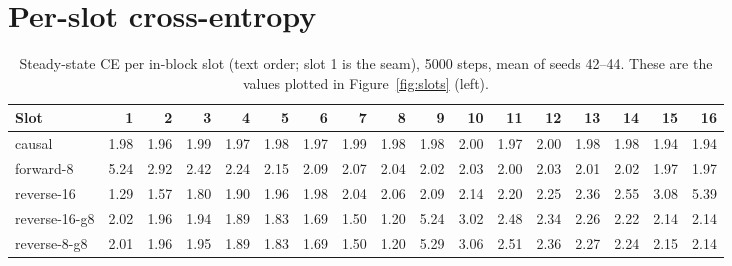 \documentclass[11pt]{article}
\theoremstyle{definition}
\theoremstyle{remark}
\newcommand{\sch}[1]{\textsf{#1}}
\begin{document}
\section{Per-slot cross-entropy}
\label{app:slots}

\begin{table}[h]
  \centering
  \caption{Steady-state CE per in-block slot (text order; slot 1 is the seam), 5000 steps, mean of seeds 42--44. These are the values plotted in Figure~\ref{fig:slots} (left).}
  \label{tab:slots}
  \scriptsize
  \setlength{\tabcolsep}{2.6pt}
  \begin{tabular}{l*{16}{r}}
    \toprule
    Slot & 1 & 2 & 3 & 4 & 5 & 6 & 7 & 8 & 9 & 10 & 11 & 12 & 13 & 14 & 15 & 16 \\
    \midrule
    \sch{causal}        & 1.98 & 1.96 & 1.99 & 1.97 & 1.98 & 1.97 & 1.99 & 1.98 & 1.98 & 2.00 & 1.97 & 2.00 & 1.98 & 1.98 & 1.94 & 1.94 \\
    \sch{forward-8}     & 5.24 & 2.92 & 2.42 & 2.24 & 2.15 & 2.09 & 2.07 & 2.04 & 2.02 & 2.03 & 2.00 & 2.03 & 2.01 & 2.02 & 1.97 & 1.97 \\
    \sch{reverse-16}    & 1.29 & 1.57 & 1.80 & 1.90 & 1.96 & 1.98 & 2.04 & 2.06 & 2.09 & 2.14 & 2.20 & 2.25 & 2.36 & 2.55 & 3.08 & 5.39 \\
    \sch{reverse-16-g8} & 2.02 & 1.96 & 1.94 & 1.89 & 1.83 & 1.69 & 1.50 & 1.20 & 5.24 & 3.02 & 2.48 & 2.34 & 2.26 & 2.22 & 2.14 & 2.14 \\
    \sch{reverse-8-g8}  & 2.01 & 1.96 & 1.95 & 1.89 & 1.83 & 1.69 & 1.50 & 1.20 & 5.29 & 3.06 & 2.51 & 2.36 & 2.27 & 2.24 & 2.15 & 2.14 \\
    \bottomrule
  \end{tabular}
\end{table}
\end{document}

